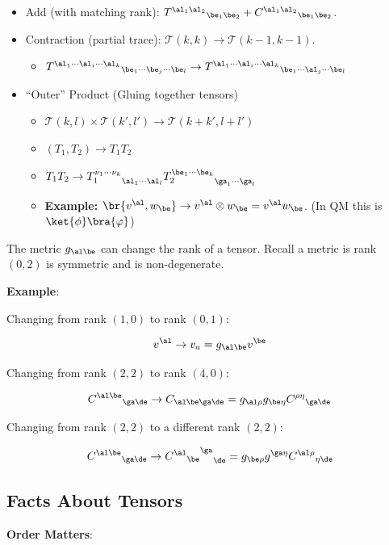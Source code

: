 \documentclass{article}
\newcommand{\heading}[1]{\vspace{0.1in}\textbf{#1}:}
\begin{document}
\begin{itemize}
    \item Add (with matching rank): ${T^{\al_1\al_2}}_{\be_1\be_2} + {C^{\al_1\al_2}}_{\be_1\be_2}$.
    \item Contraction (partial trace): $\mathcal{T} (k, k) \to \mathcal{T} (k-1, k-1)$.
    \begin{itemize}
        \item ${T^{\al_1\cdots\al_i\cdots\al_k}}_{\be_1\cdots\be_j\cdots\be_l} \to {T^{\al_1\cdots\al_i\cdots\al_k}}_{\be_1\cdots\al_j\cdots\be_l}$
    \end{itemize}
    \item ``Outer'' Product (Gluing together tensors)
    \begin{itemize}
        \item $\mathcal{T}(k,l) \times \mathcal{T}(k',l') \to \mathcal{T}(k + k', l+ l')$
        \item $(T_1, T_2) \to T_1T_2$
        \item $T_1 T_2 \to {T_1^{\nu_1\cdots\nu_k}}_{\al_1\cdots\al_l} {T_2^{\be_1\cdots\be_k}}_{\ga_1\cdots\ga_l}$
        \item \textbf{Example:} $\br{v^\al, w_\be} \to v^\al \otimes w_\be = v^\al w_\be$. (In QM this is $\ket{\phi}\bra{\varphi}$)
    \end{itemize}
\end{itemize}

The metric $g_{\al\be}$ can change the rank of a tensor. Recall a metric is rank $(0,2)$ is symmetric and is non-degenerate.

\heading{Example}

Changing from rank $(1,0)$ to rank $(0,1)$:

\[ v^\al \to v_a = g_{\al\be} v^\be \]

Changing from rank $(2,2)$ to rank $(4,0)$:

\[ {C^{\al\be}}_{\ga\de} \to C_{\al\be\ga\de} = g_{\al\rho}g_{\be\eta} {C^{\rho\eta}}_{\ga\de} \]

Changing from rank $(2,2)$ to a different rank $(2,2)$:

\[ {C^{\al\be}}_{\ga\de} \to {{{C^{\al}}_\be}^{\ga}}_\de = g_{\be\rho}g^{\ga\eta} {C^{\al\rho}}_{\eta\de} \]

\subsection{Facts About Tensors}

\heading{Order Matters}
\end{document}
